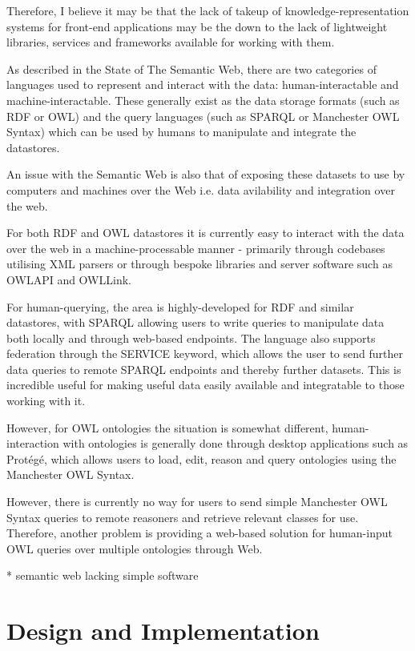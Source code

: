\documentclass{article}
\begin{document}
Therefore, I believe it may be that the lack of takeup of knowledge-representation systems
for front-end applications may be the down to the lack of lightweight libraries, 
services and frameworks available for working with them.

As described in the State of The Semantic Web, there are two categories of
languages used to represent and interact with the data: human-interactable and
machine-interactable. These generally exist as the data storage formats (such as
RDF or OWL) and the query languages (such as SPARQL or Manchester OWL Syntax)
which can be used by humans to manipulate and integrate the datastores.

An issue with the Semantic Web is also that of exposing these datasets to use by
computers and machines over the Web i.e. data avilability and integration over
the web.

For both RDF and OWL datastores it is currently easy to interact with the data
over the web in a machine-processable manner - primarily through codebases
utilising XML parsers or through bespoke libraries and server software such as 
OWLAPI and OWLLink.

For human-querying, the area is highly-developed for RDF and similar datastores, 
with SPARQL allowing users to write queries to manipulate data both locally and
through web-based endpoints. The language also supports federation through the
SERVICE keyword, which allows the user to send further data queries to remote
SPARQL endpoints and thereby further datasets. This is incredible useful for
making useful data easily available and integratable to those working with it.

However, for OWL ontologies the situation is somewhat different,
human-interaction with ontologies is generally done through desktop applications
such as Protégé, which allows users to load, edit, reason and query ontologies 
using the Manchester OWL Syntax.

However, there is currently no way for users to send simple Manchester OWL
Syntax queries to remote reasoners and retrieve relevant classes for use. 
Therefore, another problem is providing a web-based solution for human-input OWL
queries over multiple ontologies through Web. 

* semantic web lacking simple software

\section{Design and Implementation}
\end{document}
